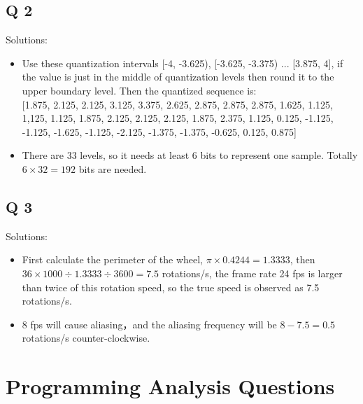 \documentclass[10pt]{report}            %
\begin{document}
 \section*{Q 2}                  %
 Solutions:
 \begin{itemize}
 	\item
 	Use these quantization intervals [-4, -3.625), [-3.625, -3.375) ... [3.875, 4], if the value is just in the middle of quantization levels then round it to the upper boundary level. Then the quantized sequence is:\\
 
 	[1.875, 2.125, 2.125, 3.125, 3.375, 2.625, 2.875, 2.875, 2.875, 1.625, 1.125, 1,125, 1.125, 1.875, 2.125, 2.125, 2.125, 1.875, 2.375, 1.125, 0.125, -1.125, -1.125, -1.625, -1.125, -2.125, -1.375, -1.375, -0.625, 0.125, 0.875]
 	\item
 	There are 33 levels, so it needs at least 6 bits to represent one sample. Totally $6\times32=192$ bits are needed.
 \end{itemize}
  \section*{Q 3}                  %
  Solutions:
  \begin{itemize}
  	\item
  	First calculate the perimeter of the wheel, $\pi\times0.4244 =1.3333$, then $36\times1000\div1.3333\div3600=7.5$ rotations/s, the frame rate 24 fps is larger than twice of this rotation speed, so the true speed is observed as 7.5 rotations/s.
  	\item
  	8 fps will cause aliasing，and the aliasing frequency will be $8-7.5=0.5$ rotations/s counter-clockwise.
  \end{itemize}
\chapter*{Programming Analysis Questions}
\end{document}
